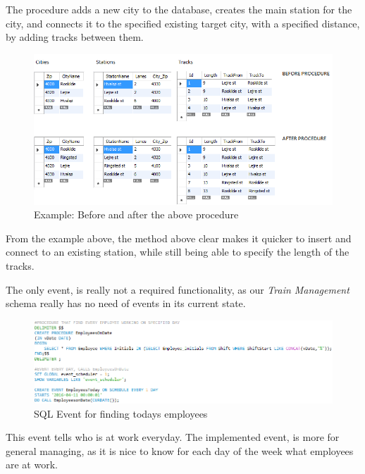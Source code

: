 The procedure adds a new city to the database, creates the main station for the 
city, and connects it to the specified existing target city, with a specified 
distance, by adding tracks between them.

\begin{figure}[ht!]
    \centering
    \includegraphics[width=1\textwidth]{img/SQL_PROCEDURE_AddCityConnect_example}
    \caption{Example: Before and after the above procedure}
\end{figure}

From the example above, the method above clear makes it quicker to insert and connect to an existing station, while still being able to specify the length of the tracks.

\newpage
The only event, is really not a required functionality, as our \emph{Train 
Management} schema really has no need of events in its current state. 

\begin{figure}[ht!]
    \centering
    \includegraphics[width=1\textwidth]{img/SQL_EVENT}
    \caption{SQL Event for finding todays employees}
\end{figure}

This event tells who is at work everyday.
The implemented event, is more for general managing, as it is nice to know for 
each day of the week what employees are at work.
